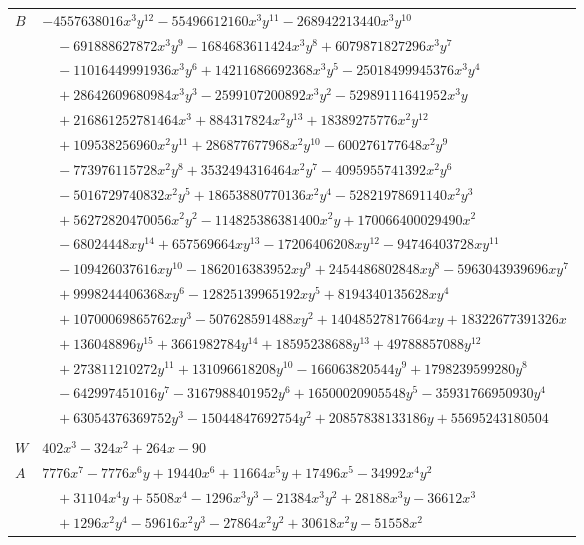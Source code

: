 \documentclass[11pt]{article}
\begin{document}
\begin{longtable}{@{}ll@{}}
$B$ & $-4557638016x^{3}y^{12}-55496612160x^{3}y^{11}-268942213440x^{3}y^{10}$\\
 & $\quad -691888627872x^{3}y^{9}-1684683611424x^{3}y^{8}+6079871827296x^{3}y^{7}$\\
 & $\quad -11016449991936x^{3}y^{6}+14211686692368x^{3}y^{5}-25018499945376x^{3}y^{4}$\\
 & $\quad +28642609680984x^{3}y^{3}-2599107200892x^{3}y^{2}-52989111641952x^{3}y$\\
 & $\quad +216861252781464x^{3}+884317824x^{2}y^{13}+18389275776x^{2}y^{12}$\\
 & $\quad +109538256960x^{2}y^{11}+286877677968x^{2}y^{10}-600276177648x^{2}y^{9}$\\
 & $\quad -773976115728x^{2}y^{8}+3532494316464x^{2}y^{7}-4095955741392x^{2}y^{6}$\\
 & $\quad -5016729740832x^{2}y^{5}+18653880770136x^{2}y^{4}-52821978691140x^{2}y^{3}$\\
 & $\quad +56272820470056x^{2}y^{2}-114825386381400x^{2}y+170066400029490x^{2}$\\
 & $\quad -68024448xy^{14}+657569664xy^{13}-17206406208xy^{12}-94746403728xy^{11}$\\
 & $\quad -109426037616xy^{10}-1862016383952xy^{9}+2454486802848xy^{8}-5963043939696xy^{7}$\\
 & $\quad +9998244406368xy^{6}-12825139965192xy^{5}+8194340135628xy^{4}$\\
 & $\quad +10700069865762xy^{3}-507628591488xy^{2}+14048527817664xy+18322677391326x$\\
 & $\quad +136048896y^{15}+3661982784y^{14}+18595238688y^{13}+49788857088y^{12}$\\
 & $\quad +273811210272y^{11}+131096618208y^{10}-166063820544y^{9}+1798239599280y^{8}$\\
 & $\quad -642997451016y^{7}-3167988401952y^{6}+16500020905548y^{5}-35931766950930y^{4}$\\
 & $\quad +63054376369752y^{3}-15044847692754y^{2}+20857838133186y+55695243180504$\\
\addlinespace[3pt]
\multicolumn{2}{@{}l}{$i=8$, $m=54$, neighbours $16,26,38,50,57,103$}\\
$W$ & $402x^{3}-324x^{2}+264x-90$\\
$A$ & $7776x^{7}-7776x^{6}y+19440x^{6}+11664x^{5}y+17496x^{5}-34992x^{4}y^{2}$\\
 & $\quad +31104x^{4}y+5508x^{4}-1296x^{3}y^{3}-21384x^{3}y^{2}+28188x^{3}y-36612x^{3}$\\
 & $\quad +1296x^{2}y^{4}-59616x^{2}y^{3}-27864x^{2}y^{2}+30618x^{2}y-51558x^{2}$\\

\end{longtable}
\end{document}
